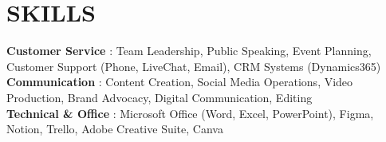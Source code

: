 \documentclass[letterpaper,11pt]{article}
\begin{document}
\section{SKILLS}
 \begin{itemize}[leftmargin=0in, label={}]
    \small{\item{
     \textbf{Customer Service}   {: Team Leadership, Public Speaking, Event Planning, Customer Support (Phone, LiveChat, Email), CRM Systems (Dynamics365)} \\
     \textbf{Communication}       {: Content Creation, Social Media Operations, Video Production, Brand Advocacy, Digital Communication, Editing} \\
     \textbf{Technical \& Office} {: Microsoft Office (Word, Excel, PowerPoint), Figma, Notion, Trello, Adobe Creative Suite, Canva} \\
    }}
 \end{itemize}


\end{document}
